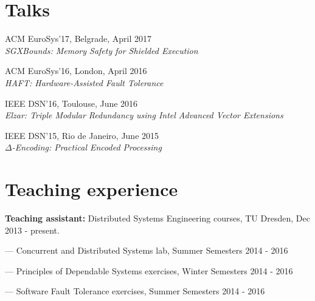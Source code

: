 \documentclass[letterpaper]{article}
\renewenvironment{itemize}{
  \begin{list}{}{
    \setlength{\leftmargin}{1.5em}
  }
}{
  \end{list}
}
\begin{document}
\clearpage







\section*{Talks}
\begin{itemize}
\item ACM EuroSys'17, Belgrade, April 2017\\
{\em  SGXBounds: Memory Safety for Shielded Execution}
\item ACM EuroSys'16, London, April 2016\\
	{\em  HAFT: Hardware-Assisted Fault Tolerance}
\item IEEE DSN'16, Toulouse, June 2016\\
	{\em  Elzar: Triple Modular Redundancy using Intel Advanced Vector Extensions}
\item IEEE DSN'15, Rio de Janeiro, June 2015\\
{\em  $\Delta$-Encoding: Practical Encoded Processing}
\end{itemize}


\section*{Teaching experience}

\begin{itemize}
\item {\bf Teaching assistant:} Distributed Systems Engineering courses, TU Dresden, Dec 2013 - present.
\begin{itemize}
	\item --- Concurrent and Distributed Systems lab, Summer Semesters 2014 - 2016 
	\item --- Principles of Dependable Systems exercises, Winter Semesters 2014 - 2016
	\item --- Software Fault Tolerance exercises, Summer Semesters 2014 - 2016
\end{itemize}
\end{itemize}
\end{document}
